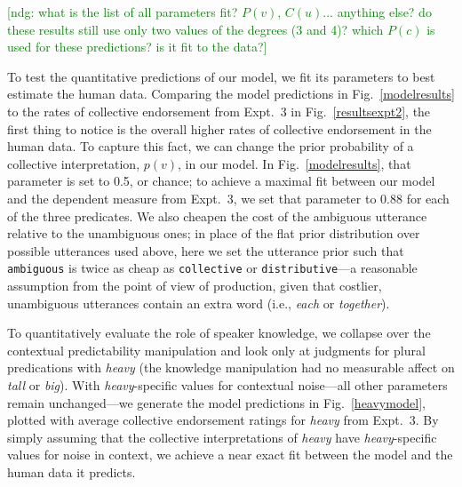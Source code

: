 \documentclass[linguex]{sp}
\newcommand{\ndg}[1]{\textcolor{Green}{[ndg: #1]}}
\begin{document}
\ndg{what is the list of all parameters fit? $P(v)$, $C(u)$... anything else? do these results still use only two values of the degrees (3 and 4)? which $P(c)$ is used for these predictions? is it fit to the data?}

To test the quantitative predictions of our model, we fit its parameters to best estimate the human data. Comparing the model predictions in Fig.~\ref{modelresults} to the rates of collective endorsement from Expt.~3 in Fig.~\ref{resultsexpt2}, the first thing to notice is the overall higher rates of collective endorsement in the human data. To capture this fact, we can change the prior probability of a collective interpretation, $p(v)$, in our model. In Fig.~\ref{modelresults}, that parameter is set to 0.5, or chance; to achieve a maximal fit between our model and the dependent measure from Expt.~3, we set that parameter to 0.88 for each of the three predicates. We also cheapen the cost of the ambiguous utterance relative to the unambiguous ones; in place of the flat prior distribution over possible utterances used above, here we set the utterance prior such that \texttt{ambiguous} is twice as cheap as \texttt{collective} or \texttt{distributive}---a reasonable assumption from the point of view of production, given that costlier, unambiguous utterances contain an extra word (i.e., \emph{each} or \emph{together}).

To quantitatively evaluate the role of speaker knowledge, we collapse over the contextual predictability manipulation and look only at judgments for plural predications with \emph{heavy} (the knowledge manipulation had no measurable affect on \emph{tall} or \emph{big}). %
With \emph{heavy}-specific values for contextual noise---all other parameters remain unchanged---we generate the model predictions in Fig.~\ref{heavymodel}, plotted with average collective endorsement ratings for \emph{heavy} from Expt.~3. By simply assuming that the collective interpretations of \emph{heavy} have \emph{heavy}-specific values for noise in context, we achieve a near exact fit between the model and the human data it predicts.
\end{document}
